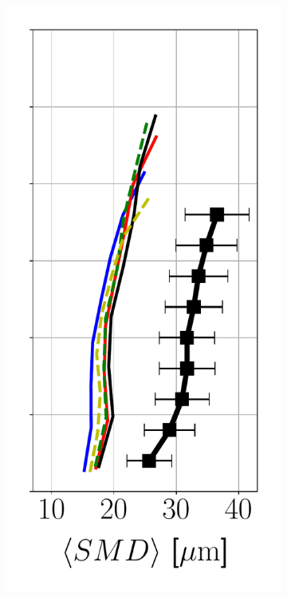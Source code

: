 \begin{figure}[t!]
\begin{subfigure}[b]{0.2\textwidth}
\end{subfigure}
\hspace*{0.5in}
\begin{subfigure}[b]{0.2\textwidth}
	\flushleft
   \includegraphics[scale=0.35]{./part2_developments/figures_ch6_lagrangian_JICF/apte_model_calibration_u_vw_lognorm/profiles/SMD_along_z}

\end{subfigure}
\end{figure}
